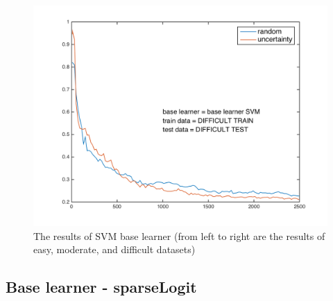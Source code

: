 \documentclass{article}
\begin{document}
\begin{figure}[h]
\begin{minipage}{.31\textwidth}
    \end{minipage}
    \hfill
    \centering
    \begin{minipage}{.31\textwidth}
      \centering
      \includegraphics[width=1\linewidth]{../svm_difficult}
    \end{minipage}
    \caption{The results of SVM base learner (from left to right are the results of easy, moderate, and difficult datasets)}
    \label{fig:svm}
  \end{figure}

\subsection{Base learner - sparseLogit}
\end{document}

